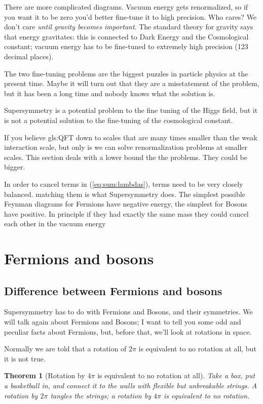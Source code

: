 \documentclass[]{article}
\newtheorem{thm}{Theorem}
\begin{document}
There are more complicated diagrams. Vacuum energy gets renormalized, so if you want it to be zero you'd better fine-tune it to high precision. Who cares? We don't care \emph{until gravity becomes important}. The standard theory for gravity says that energy gravitates: this is connected to Dark Energy and the Cosmological constant; vacuum energy has to be fine-tuned to extremely high precision (123 decimal places).

The two fine-tuning problems are the biggest puzzles in particle physics at the present time. Maybe it will turn out that they are a misstatement of the problem, but it has been a long time and nobody knows what the solution is.
 
Supersymmetry is a potential problem to the fine tuning of the Higgs field, but it is not a potential solution to the fine-tuning of the cosmological constant.

If you believe \gls{gls:QFT} down to scales that are many times smaller than the weak interaction scale, but only is we can solve renormalization problems at smaller scales. This section deals with a lower bound the the problems. They could be bigger.

In order to cancel terms in (\ref{eq:sum:lambdas}), terms need to be very closely balanced. matching them is what Supersymmetry does. The simplest possible Feynman diagrams for Fermions have negative energy, the simplest for Bosons have positive. In principle if they had exactly the same mass they could cancel each other in the vacuum energy
	
\section{Fermions and bosons}

\subsection{Difference between Fermions and bosons}

Supersymmetry has to do with Fermions and Bosons, and their symmetries. We will talk again about Fermions and Bosons; I want to tell you some odd and peculiar facts about Fermions, but, before that, we'll look at rotations in space.

Normally we are told that a rotation of $2\pi$ is equivalent to no rotation at all, but it is not true.

\begin{thm}[Rotation by $4\pi$ is equivalent to no rotation at all]
	Take a box, put a basketball in, and connect it to the walls with flexible but unbreakable strings. A rotation by $2\pi$ tangles the strings; a rotation by $4\pi$ is equivalent to no rotation.
\end{thm}
\end{document}
